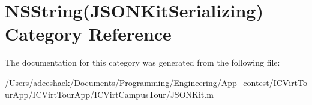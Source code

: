 \hypertarget{category_n_s_string_07_j_s_o_n_kit_serializing_08}{\section{N\-S\-String(J\-S\-O\-N\-Kit\-Serializing) Category Reference}
\label{category_n_s_string_07_j_s_o_n_kit_serializing_08}
}


The documentation for this category was generated from the following file\-:\begin{DoxyCompactItemize}
\item 
/\-Users/adeeshaek/\-Documents/\-Programming/\-Engineering/\-App\-\_\-contest/\-I\-C\-Virt\-Tour\-App/\-I\-C\-Virt\-Tour\-App/\-I\-C\-Virt\-Campus\-Tour/J\-S\-O\-N\-Kit.\-m\end{DoxyCompactItemize}
